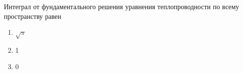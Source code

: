 Интеграл от фундаментального решения уравнения теплопроводности по всему пространству равен

\begin{enumerate}[label=\arabic*)]
    \item \(\sqrt{\pi }\)
    \item 1
    \item 0
\end{enumerate}


